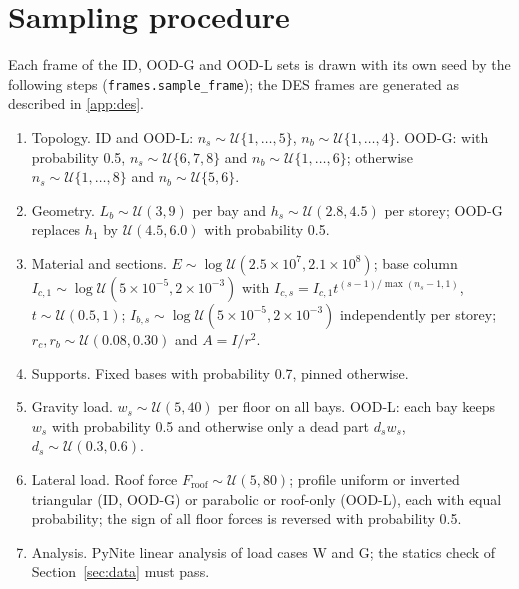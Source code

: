 \section{Sampling procedure}\label{app:sampling}
Each frame of the ID, OOD-G and OOD-L sets is drawn with its own seed by the following steps (\texttt{frames.sample\_frame}); the DES frames are generated as described in \ref{app:des}.
\begin{enumerate}
\item Topology. ID and OOD-L: $n_s\sim\mathcal{U}\{1,\dots,5\}$, $n_b\sim\mathcal{U}\{1,\dots,4\}$. OOD-G: with probability 0.5, $n_s\sim\mathcal{U}\{6,7,8\}$ and $n_b\sim\mathcal{U}\{1,\dots,6\}$; otherwise $n_s\sim\mathcal{U}\{1,\dots,8\}$ and $n_b\sim\mathcal{U}\{5,6\}$.
\item Geometry. $L_b\sim\mathcal{U}(3,9)$ per bay and $h_s\sim\mathcal{U}(2.8,4.5)$ per storey; OOD-G replaces $h_1$ by $\mathcal{U}(4.5,6.0)$ with probability 0.5.
\item Material and sections. $E\sim\log\mathcal{U}(2.5\times10^7,2.1\times10^8)$; base column $I_{c,1}\sim\log\mathcal{U}(5\times10^{-5},2\times10^{-3})$ with $I_{c,s}=I_{c,1}t^{(s-1)/\max(n_s-1,1)}$, $t\sim\mathcal{U}(0.5,1)$; $I_{b,s}\sim\log\mathcal{U}(5\times10^{-5},2\times10^{-3})$ independently per storey; $r_c,r_b\sim\mathcal{U}(0.08,0.30)$ and $A=I/r^2$.
\item Supports. Fixed bases with probability 0.7, pinned otherwise.
\item Gravity load. $w_s\sim\mathcal{U}(5,40)$ per floor on all bays. OOD-L: each bay keeps $w_s$ with probability 0.5 and otherwise only a dead part $d_s w_s$, $d_s\sim\mathcal{U}(0.3,0.6)$.
\item Lateral load. Roof force $F_\mathrm{roof}\sim\mathcal{U}(5,80)$; profile uniform or inverted triangular (ID, OOD-G) or parabolic or roof-only (OOD-L), each with equal probability; the sign of all floor forces is reversed with probability 0.5.
\item Analysis. PyNite linear analysis of load cases W and G; the statics check of Section~\ref{sec:data} must pass.
\end{enumerate}

